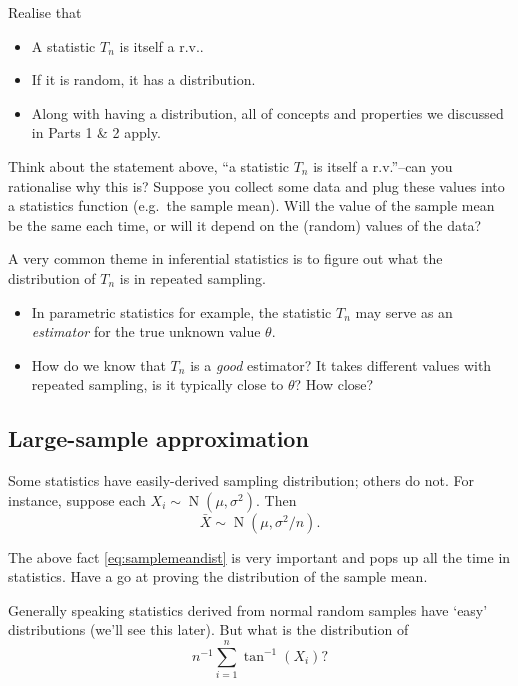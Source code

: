 \documentclass[
]{book}
\providecommand{\tightlist}{%
  \setlength{\itemsep}{0pt}\setlength{\parskip}{0pt}}
\DeclareMathOperator{\N}{N}
\theoremstyle{definition}
\theoremstyle{definition}
\theoremstyle{definition}
\theoremstyle{definition}
\theoremstyle{remark}
\begin{document}
Realise that

\begin{itemize}
\tightlist
\item
  A statistic \(T_n\) is itself a r.v..
\item
  If it is random, it has a distribution.
\item
  Along with having a distribution, all of concepts and properties we discussed in Parts 1 \& 2 apply.
\end{itemize}

Think about the statement above, ``a statistic \(T_n\) is itself a r.v.''--can you rationalise why this is? Suppose you collect some data and plug these values into a statistics function (e.g.~the sample mean). Will the value of the sample mean be the same each time, or will it depend on the (random) values of the data?

A very common theme in inferential statistics is to figure out what the distribution of \(T_n\) is in repeated sampling.

\begin{itemize}
\tightlist
\item
  In parametric statistics for example, the statistic \(T_n\) may serve as an \emph{estimator} for the true unknown value \(\theta\).
\item
  How do we know that \(T_n\) is a \emph{good} estimator? It takes different values with repeated sampling, is it typically close to \(\theta\)? How close?
\end{itemize}

\hypertarget{large-sample-approximation}{%
\subsection{Large-sample approximation}\label{large-sample-approximation}}

Some statistics have easily-derived sampling distribution; others do not.
For instance, suppose each \(X_i\sim\N(\mu,\sigma^2)\). Then
\begin{equation}
\bar X \sim \N(\mu, \sigma^2/n). \label{eq:samplemeandist}
\end{equation}

The above fact \eqref{eq:samplemeandist} is very important and pops up all the time in statistics. Have a go at proving the distribution of the sample mean.

Generally speaking statistics derived from normal random samples have `easy' distributions (we'll see this later).
But what is the distribution of
\[
n^{-1}\sum_{i=1}^n \tan^{-1}(X_i)?
\]
\end{document}
